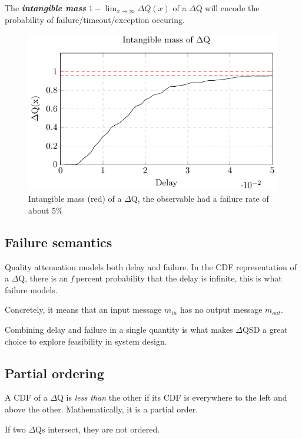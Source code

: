     The \textbf{\textit{intangible mass}} $1 - \lim_{x\to\infty}\Delta Q(x)$ of a $\Delta$Q will encode the probability of failure/timeout/exception occuring.
    
    \begin{figure}[H]
        \begin{center}
            \includegraphics{tikz/intangible.pdf}
        \end{center}
        \caption{Intangible mass (red) of a $\Delta$Q, the observable had a failure rate of about 5\% }
    \end{figure}
   
  \subsection{Failure semantics}
        Quality attenuation models both delay and failure. In the CDF representation of a $\Delta$Q, there is an \textit{f} percent probability that the delay is infinite, this is what failure models. 

        Concretely, it means that an input message $m_{in}$ has no output message $m_{out}$.

        Combining delay and failure in a single quantity is what makes $\Delta$QSD a great choice to explore feasibility in system design.
   
    \subsection{Partial ordering}
        A CDF of a $\Delta$Q is \textit{less than} the other if its CDF is everywhere to the left and above the other. Mathematically, it is a partial order. 
        
        If two $\Delta$Qs intersect, they are not ordered.

